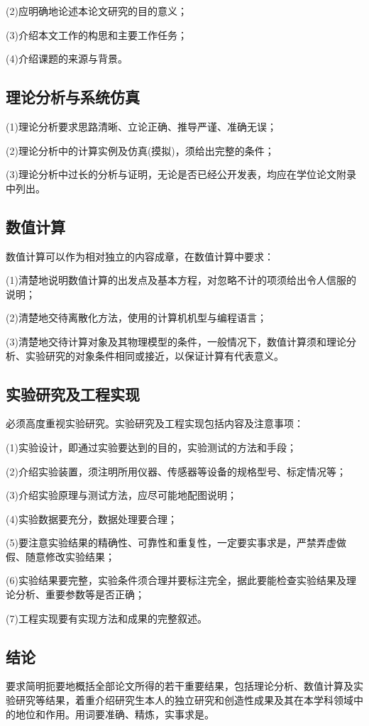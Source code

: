 (2)应明确地论述本论文研究的目的意义；

(3)介绍本文工作的构思和主要工作任务；

(4)介绍课题的来源与背景。

\subsection{理论分析与系统仿真}
(1)理论分析要求思路清晰、立论正确、推导严谨、准确无误；

(2)理论分析中的计算实例及仿真(摸拟)，须给出完整的条件；

(3)理论分析中过长的分析与证明，无论是否已经公开发表，均应在学位论文附录中列出。

\subsection{数值计算}
数值计算可以作为相对独立的内容成章，在数值计算中要求：

(1)清楚地说明数值计算的出发点及基本方程，对忽略不计的项须给出令人信服的说明；

(2)清楚地交待离散化方法，使用的计算机机型与编程语言；

(3)清楚地交待计算对象及其物理模型的条件，一般情况下，数值计算须和理论分析、实验研究的对象条件相同或接近，以保证计算有代表意义。

\subsection{实验研究及工程实现}
必须高度重视实验研究。实验研究及工程实现包括内容及注意事项：

(1)实验设计，即通过实验要达到的目的，实验测试的方法和手段；

(2)介绍实验装置，须注明所用仪器、传感器等设备的规格型号、标定情况等；

(3)介绍实验原理与测试方法，应尽可能地配图说明；

(4)实验数据要充分，数据处理要合理；

(5)要注意实验结果的精确性、可靠性和重复性，一定要实事求是，严禁弄虚做假、随意修改实验结果；

(6)实验结果要完整，实验条件须合理并要标注完全，据此要能检查实验结果及理论分析、重要参数等是否正确；

(7)工程实现要有实现方法和成果的完整叙述。

\subsection{结论}
要求简明扼要地概括全部论文所得的若干重要结果，包括理论分析、数值计算及实验研究等结果，着重介绍研究生本人的独立研究和创造性成果及其在本学科领域中的地位和作用。用词要准确、精炼，实事求是。

